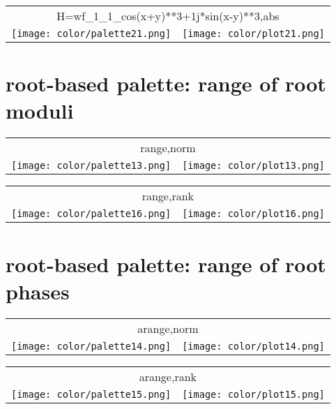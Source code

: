 \documentclass{article}
\begin{document}
\begin{center}
\begin{tabular}{m{8cm}m{8cm}}
\multicolumn{2}{c}{H=wf\_1\_1\_cos(x+y)**3+1j*sin(x-y)**3,abs} \\
\texttt{[image: color/palette21.png]} &
\texttt{[image: color/plot21.png]}
\end{tabular}
\end{center}

\newpage
\section{root-based palette: range of root moduli}
\begin{center}
\begin{tabular}{m{8cm}m{8cm}}
\multicolumn{2}{c}{range,norm} \\
\texttt{[image: color/palette13.png]} &
\texttt{[image: color/plot13.png]}
\end{tabular}
\end{center}

\begin{center}
\begin{tabular}{m{8cm}m{8cm}}
\multicolumn{2}{c}{range,rank} \\
\texttt{[image: color/palette16.png]} &
\texttt{[image: color/plot16.png]}
\end{tabular}
\end{center}

\newpage
\section{root-based palette: range of root phases}

\begin{center}
\begin{tabular}{m{8cm}m{8cm}}
\multicolumn{2}{c}{arange,norm} \\
\texttt{[image: color/palette14.png]} &
\texttt{[image: color/plot14.png]}
\end{tabular}
\end{center}

\begin{center}
\begin{tabular}{m{8cm}m{8cm}}
\multicolumn{2}{c}{arange,rank} \\
\texttt{[image: color/palette15.png]} &
\texttt{[image: color/plot15.png]}
\end{tabular}
\end{center}
\end{document}
